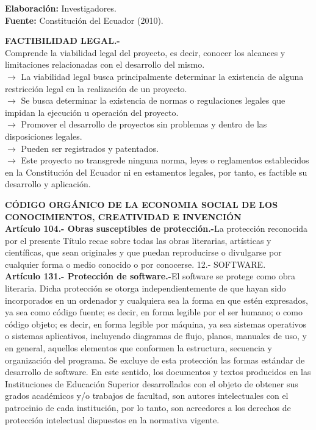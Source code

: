 \documentclass[12pt, a4paper, nofontenc, numbers=endperiod]{apa7}
\begin{document}
{\begin{table}[h]
{{\begin{tabular}{|p{4cm}|p{11.1cm}|}
				\hline
			\end{tabular}
		}
	}
\end{table}
\vspace*{-1cm}
\begin{center}
	\footnotesize
	\singlespacing\textbf{Elaboración:} Investigadores.\\
	\textbf{Fuente:} Constitución del Ecuador (2010).
\end{center}
\justify
\textbf{FACTIBILIDAD LEGAL.-}\\
Comprende la viabilidad legal del proyecto, es decir, conocer los alcances y limitaciones relacionadas con el desarrollo del mismo.\\
$\rightarrow$ La viabilidad legal busca principalmente determinar la existencia de alguna restricción legal en la realización de un proyecto.\\
$\rightarrow$ Se busca determinar la existencia de normas o regulaciones legales que impidan la ejecución u operación del proyecto.\\
$\rightarrow$ Promover el desarrollo de proyectos sin problemas y dentro de las disposiciones legales.\\
$\rightarrow$ Pueden ser registrados y patentados.\\
$\rightarrow$ Este proyecto no transgrede ninguna norma, leyes o reglamentos establecidos en la Constitución del Ecuador ni en estamentos legales, por tanto, es factible su desarrollo y aplicación.

\textbf{CÓDIGO ORGÁNICO DE LA ECONOMIA SOCIAL DE LOS CONOCIMIENTOS, CREATIVIDAD E INVENCIÓN}\\
\textbf{Artículo 104.- Obras susceptibles de protección.-}La protección reconocida por el presente Título recae sobre todas las obras literarias, artísticas y científicas, que sean originales y que puedan reproducirse o divulgarse por cualquier forma o medio conocido o por conocerse. 12.- SOFTWARE.\\
\textbf{Artículo 131.- Protección de software.-}El software se protege como obra literaria. Dicha protección se otorga independientemente de que hayan sido incorporados en un ordenador y cualquiera sea la forma en que estén expresados, ya sea como código fuente; es decir, en forma legible por el ser humano; o como código objeto; es decir, en forma legible por máquina, ya sea sistemas operativos o sistemas aplicativos, incluyendo diagramas de flujo, planos, manuales de uso, y en general, aquellos elementos que conformen la estructura, secuencia y organización del programa. Se excluye de esta protección las formas estándar de desarrollo de software. En este sentido, los documentos y textos producidos en las Instituciones de Educación Superior desarrollados con el objeto de obtener sus grados académicos y/o trabajos de facultad, son autores intelectuales con el patrocinio de cada institución, por lo tanto, son acreedores a los derechos de protección intelectual dispuestos en la normativa vigente.

}
\end{document}

